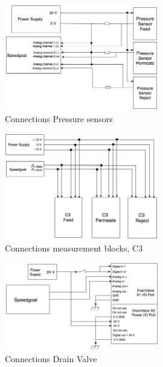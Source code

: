 \begin{figure}[h]
    \centering
    \includegraphics[width=0.6\textwidth]{PressConn}
    \caption{Connections Pressure sensors}
    \label{fig:PressConn}
\end{figure}

\newpage

\begin{figure}[h]
    \centering
    \includegraphics[width=0.6\textwidth]{C3Conn}
    \caption{Connections measurement blocks, C3}
    \label{fig:C3Conn}
\end{figure}

\begin{figure}[h]
    \centering
    \includegraphics[width=0.6\textwidth]{ValveConn}
    \caption{Connections Drain Valve}
    \label{fig:ValveConn}
\end{figure}

\newpage

